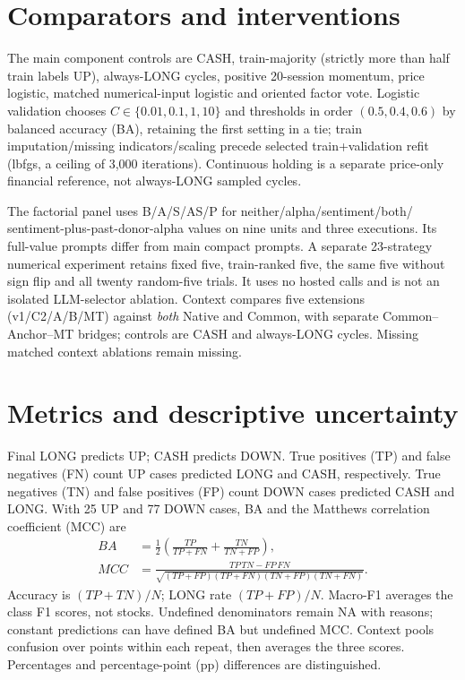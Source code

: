 \section{Comparators and interventions}\label{s:351598650d1ea43f}
The main component controls are CASH, train-majority (strictly more than half
train labels UP), always-LONG cycles, positive 20-session momentum,
price logistic, matched numerical-input logistic and oriented factor
vote. Logistic validation chooses $C\in\{0.01,0.1,1,10\}$ and thresholds in
order $(0.5,0.4,0.6)$ by balanced accuracy (BA), retaining the first setting in a tie; train imputation/missing
indicators/scaling precede selected train+validation refit (lbfgs,
a ceiling of 3,000 iterations). Continuous holding is a separate price-only
financial reference, not always-LONG sampled cycles.

The factorial panel uses B/A/S/AS/P for neither/alpha/sentiment/both/
sentiment-plus-past-donor-alpha values on nine units and three executions.
Its full-value prompts differ from main compact prompts. A separate
23-strategy numerical experiment retains fixed five, train-ranked five,
the same five without sign flip and all twenty random-five trials. It
uses no hosted calls and is not an isolated LLM-selector ablation.
Context compares five extensions (v1/C2/A/B/MT) against \emph{both} Native
and Common, with separate Common--Anchor--MT bridges; controls are CASH
and always-LONG cycles. Missing matched context ablations remain missing.

\section{Metrics and descriptive uncertainty}\label{s:ef6038a5b0f5c76d}
Final LONG predicts UP; CASH predicts DOWN. True positives (TP) and false
negatives (FN) count UP cases predicted LONG and CASH, respectively.
True negatives (TN) and false positives (FP) count DOWN cases predicted
CASH and LONG. With 25 UP and 77 DOWN cases, BA and the Matthews
correlation coefficient (MCC) are
\begin{align}
BA&=\tfrac12\left(\frac{TP}{TP+FN}+\frac{TN}{TN+FP}\right),\\
MCC&=\frac{TP\,TN-FP\,FN}{\sqrt{(TP+FP)(TP+FN)(TN+FP)(TN+FN)}}.
\end{align}
Accuracy is $(TP+TN)/N$; LONG rate $(TP+FP)/N$. Macro-F1 averages the
class F1 scores, not stocks. Undefined denominators remain NA with reasons;
constant predictions can have defined BA but undefined MCC. Context pools
confusion over points within each repeat, then averages the three scores.
Percentages and percentage-point (pp) differences are distinguished.

